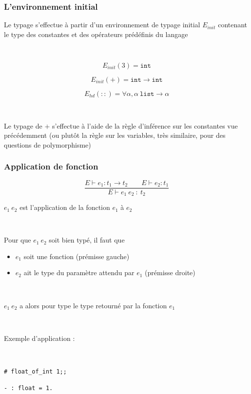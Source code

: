 \documentclass[handout,t]{beamer}
\begin{document}
\begin{frame}

\frametitle{L'environnement initial}

Le typage s'effectue à partir d'un environnement de typage
initial
$E_{init}$
contenant le type des constantes et des opérateurs
prédéfinis du langage

~

$$E_{init}(3)=\mathtt{int}$$


$$E_{init}(+)=\mathtt{int}\rightarrow \mathtt{int}$$



$$E_{hd}(\mathtt{::})=\forall \alpha, \alpha\ \mathtt{list} \rightarrow \alpha$$

~

Le typage de $+$ s'effectue à l'aide de la règle d'inférence sur
les constantes vue précédemment (ou plutôt la règle sur les
variables, très similaire, pour des questions de polymorphisme)


\end{frame}

\begin{frame}

\frametitle{Application de fonction}

$$
\frac{E\vdash e_1 : t_1\rightarrow t_2\quad \quad E\vdash e_2 : t_1}
     {E\vdash e_1\ e_2\ :\ t_2}
$$


$e_1\ e_2$ est l'application de la fonction $e_1$ à $e_2$

~

Pour que $e_1\ e_2$ soit bien typé, il faut que 
\begin{itemize}
\item $e_1$
soit une fonction (prémisse gauche)
\item $e_2$
ait le type du paramètre attendu par $e_1$ (prémisse droite)
\end{itemize}

~

$e_1\ e_2$ a alors pour type le type retourné par la fonction $e_1$

~

Exemple d'application :

\color{blue}

~

\texttt{\# float\_of\_int 1;;}

\texttt{- : float = 1.}


\end{frame}
\end{document}
